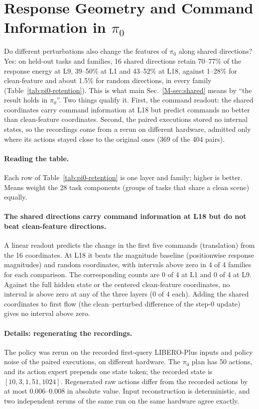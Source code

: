 \section{Response Geometry and Command Information in \texorpdfstring{$\pi_0$}{the Second Policy}}
\label{sec:supp-pi0-internals}

Do different perturbations also change the features of $\pi_0$ along shared directions? Yes: on held-out tasks and families, 16 shared directions retain 70--77\% of the response energy at L9, 39--50\% at L1 and 43--52\% at L18, against 1--28\% for clean-feature and about 1.5\% for random directions, in every family (Table~\ref{tab:pi0-retention}). This is what main Sec.~\ref*{M-sec:shared} means by ``the result holds in $\pi_0$''. Two things qualify it. First, the command readout: the shared coordinates carry command information at L18 but predict commands no better than clean-feature coordinates. Second, the paired executions stored no internal states, so the recordings come from a rerun on different hardware, admitted only where its actions stayed close to the original ones (369 of the 404 pairs).

\paragraph{Reading the table.}
Each row of Table~\ref{tab:pi0-retention} is one layer and family; higher is better. Means weight the 28 task components (groups of tasks that share a clean scene) equally.

\paragraph{The shared directions carry command information at L18 but do not beat clean-feature directions.}
A linear readout predicts the change in the first five commands (translation) from the 16 coordinates. At L18 it beats the magnitude baseline (positionwise response magnitudes) and random coordinates, with intervals above zero in 4 of 4 families for each comparison. The corresponding counts are 0 of 4 at L1 and 0 of 4 at L9. Against the full hidden state or the centered clean-feature coordinates, no interval is above zero at any of the three layers (0 of 4 each). Adding the shared coordinates to first flow (the clean--perturbed difference of the step-0 update) gives no interval above zero.

\paragraph{Details: regenerating the recordings.}
The policy was rerun on the recorded first-query LIBERO-Plus inputs and policy noise of the paired executions, on different hardware. The $\pi_0$ plan has 50 actions, and its action expert prepends one state token; the recorded state is $[10,3,1,51,1024]$. Regenerated raw actions differ from the recorded actions by at most 0.006--0.008 in absolute value. Input reconstruction is deterministic, and two independent reruns of the same run on the same hardware agree exactly.

